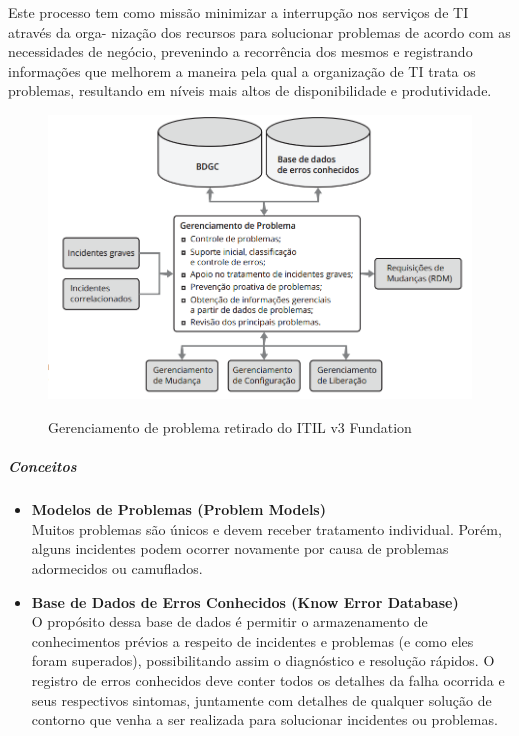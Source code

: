 \documentclass[11pt,a4paper]{article}
\begin{document}
Este processo tem como missão minimizar a interrupção nos serviços de TI através da orga-
nização dos recursos para solucionar problemas de acordo com as necessidades de negócio, 
prevenindo a recorrência dos mesmos e registrando informações que melhorem a maneira 
pela qual a organização de TI trata os problemas, resultando em níveis mais altos de disponibilidade e produtividade.

\begin{figure}[!h]
\caption{Gerenciamento de problema retirado do ITIL v3 Fundation}
\centering %
\includegraphics[width=15cm]{itil_images/gerenciamento_de_problema.png}
\label{figura:Gerenciamento de problemas retirado do ITIL v3 Fundation}
\end{figure}

\subparagraph*{Conceitos}
\begin{itemize}[noitemsep]
	\item {\bfseries Modelos de Problemas (Problem Models)} \\
		Muitos problemas são únicos e devem receber tratamento individual. Porém, alguns incidentes 				podem ocorrer novamente por causa de problemas adormecidos ou camuflados.	
	\item {\bfseries Base de Dados de Erros Conhecidos (Know Error Database) } \\
		O propósito dessa base de dados é permitir o armazenamento de conhecimentos prévios a 
	respeito de incidentes e problemas (e como eles foram superados), possibilitando assim o 
	diagnóstico e resolução rápidos. O registro de erros conhecidos deve conter todos os detalhes da 		falha ocorrida e seus respectivos sintomas, juntamente com detalhes de qualquer solução de contorno 		que venha a ser realizada para solucionar incidentes ou problemas.
\end{itemize}
\end{document}
